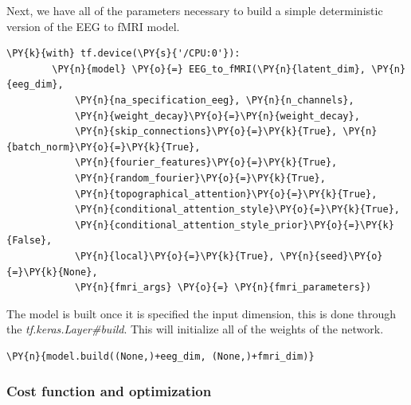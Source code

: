 Next, we have all of the parameters necessary to build a simple deterministic version of the EEG to fMRI model.
\begin{Verbatim}[commandchars=\\\{\},fontsize=\footnotesize]
    \PY{k}{with} tf.device(\PY{s}{'/CPU:0'}):
        \PY{n}{model} \PY{o}{=} EEG_to_fMRI(\PY{n}{latent_dim}, \PY{n}{eeg_dim}, 
            \PY{n}{na_specification_eeg}, \PY{n}{n_channels}, 
            \PY{n}{weight_decay}\PY{o}{=}\PY{n}{weight_decay}, 
            \PY{n}{skip_connections}\PY{o}{=}\PY{k}{True}, \PY{n}{batch_norm}\PY{o}{=}\PY{k}{True}, 
            \PY{n}{fourier_features}\PY{o}{=}\PY{k}{True}, 
            \PY{n}{random_fourier}\PY{o}{=}\PY{k}{True}, 
            \PY{n}{topographical_attention}\PY{o}{=}\PY{k}{True}, 
            \PY{n}{conditional_attention_style}\PY{o}{=}\PY{k}{True},
            \PY{n}{conditional_attention_style_prior}\PY{o}{=}\PY{k}{False}, 
            \PY{n}{local}\PY{o}{=}\PY{k}{True}, \PY{n}{seed}\PY{o}{=}\PY{k}{None}, 
            \PY{n}{fmri_args} \PY{o}{=} \PY{n}{fmri_parameters})
\end{Verbatim}
The model is built once it is specified the input dimension, this is done through the \textit{tf.keras.Layer\#build}. This will initialize all of the weights of the network.
\begin{Verbatim}[commandchars=\\\{\},fontsize=\footnotesize]
    \PY{n}{model.build((None,)+eeg_dim, (None,)+fmri_dim)}
\end{Verbatim}

\subsubsection{Cost function and optimization}

